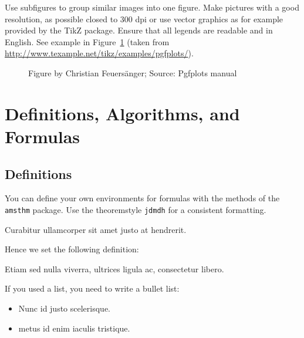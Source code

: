 \documentclass{jdmdh}
\begin{document}
Use subfigures to group similar images into one figure. Make pictures with a good resolution, as possible closed to 300 dpi or use vector graphics as for example provided by the TikZ package. Ensure that all legends are readable and in English. See example in Figure~\ref{fig:example} (taken from \url{http://www.texample.net/tikz/examples/pgfplots/}).


\begin{figure}
  \centering

  \caption{Figure by Christian Feuers\"anger; Source: Pgfplots manual}
  \label{fig:example}
\end{figure}

\section{Definitions, Algorithms, and Formulas}

\subsection{Definitions}
You can define your own environments for formulas with the methods of the \texttt{amsthm} package. Use the theoremstyle \texttt{jdmdh} for a consistent formatting.

\begin{definition}[alpha]
Curabitur ullamcorper sit amet justo at hendrerit.
\end{definition}

Hence we set the following definition:

\begin{definition}
Etiam sed nulla viverra, ultrices ligula ac, consectetur libero.
\end{definition}


If you used a list, you need to write a bullet list:
\begin{itemize}
  \item Nunc id justo scelerisque.
  \item metus id enim iaculis tristique.
\end{itemize}
\end{document}
